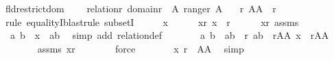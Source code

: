 \begin{isabellebody}
\isanewline
{}\isamarkupfalse%
\ fld{\isacharunderscore}{\kern0pt}restrict{\isacharunderscore}{\kern0pt}dom\ {\isacharcolon}{\kern0pt}\isanewline
\ \ \ {\isachardoublequoteopen}relation{\isacharparenleft}{\kern0pt}r{\isacharparenright}{\kern0pt}{\isachardoublequoteclose}\ {\isachardoublequoteopen}domain{\isacharparenleft}{\kern0pt}r{\isacharparenright}{\kern0pt}\ {\isasymsubseteq}\ A{\isachardoublequoteclose}\ {\isachardoublequoteopen}range{\isacharparenleft}{\kern0pt}r{\isacharparenright}{\kern0pt}{\isasymsubseteq}\ A{\isachardoublequoteclose}\isanewline
\ \ \ {\isachardoublequoteopen}r{\isasyminter}\ A{\isasymtimes}A\ {\isacharequal}{\kern0pt}\ r{\isachardoublequoteclose}\isanewline
%
\isadelimproof
%
\endisadelimproof
%
\isatagproof
{}\isamarkupfalse%
\ {\isacharparenleft}{\kern0pt}rule\ equalityI{\isacharcomma}{\kern0pt}blast{\isacharcomma}{\kern0pt}rule\ subsetI{\isacharparenright}{\kern0pt}\isanewline
\ \ \isacommand{{\isacharbraceleft}{\kern0pt}}\isamarkupfalse%
\ \isamarkupfalse%
\ x\isanewline
\ \ \ \ \isamarkupfalse%
\ xr{\isacharcolon}{\kern0pt}\ {\isachardoublequoteopen}x\ {\isasymin}\ r{\isachardoublequoteclose}\isanewline
\ \ \ \ \isamarkupfalse%
\ xr\ assms\ \isamarkupfalse%
\ {\isachardoublequoteopen}{\isasymexists}\ a\ b\ {\isachardot}{\kern0pt}\ x\ {\isacharequal}{\kern0pt}\ {\isasymlangle}a{\isacharcomma}{\kern0pt}b{\isasymrangle}{\isachardoublequoteclose}\ \isamarkupfalse%
\ {\isacharparenleft}{\kern0pt}simp\ add{\isacharcolon}{\kern0pt}\ relation{\isacharunderscore}{\kern0pt}def{\isacharparenright}{\kern0pt}\isanewline
\ \ \ \ \isamarkupfalse%
\ \isamarkupfalse%
\ a\ b\ \ {\isachardoublequoteopen}{\isasymlangle}a{\isacharcomma}{\kern0pt}b{\isasymrangle}\ {\isasymin}\ r{\isachardoublequoteclose}\ {\isachardoublequoteopen}{\isasymlangle}a{\isacharcomma}{\kern0pt}b{\isasymrangle}\ {\isasymin}\ r{\isasyminter}A{\isasymtimes}A{\isachardoublequoteclose}\ {\isachardoublequoteopen}x\ {\isasymin}\ r{\isasyminter}A{\isasymtimes}A{\isachardoublequoteclose}\isanewline
\ \ \ \ \ \ \isamarkupfalse%
\ assms\ xr\isanewline
\ \ \ \ \ \ \isamarkupfalse%
\ force\isanewline
\ \ \ \ \isamarkupfalse%
\ \isamarkupfalse%
\ {\isachardoublequoteopen}x{\isasymin}\ r\ {\isasyminter}\ A{\isasymtimes}A{\isachardoublequoteclose}\ \isamarkupfalse%
\ simp\isanewline
\ \ \isacommand{{\isacharbraceright}{\kern0pt}}\isamarkupfalse%

\end{isabellebody}
